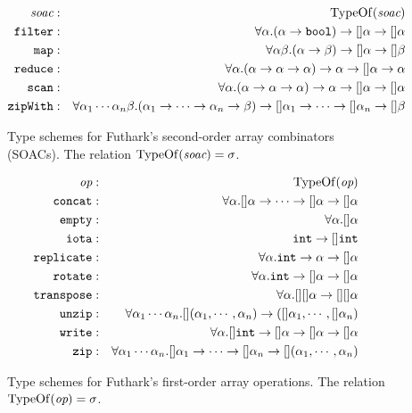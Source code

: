 \documentclass[11pt]{book}
\begin{document}
\begin{figure}
  \begin{eqnarray*}
\mbox{\it{soac}} & : & \mathrm{TypeOf}(\mbox{\it{soac}}) \\
    \texttt{filter} & : & \forall \alpha. (\alpha \rightarrow \mathtt{bool}) \rightarrow []\alpha \rightarrow []\alpha\\
    \texttt{map} & : & \forall \alpha\beta. (\alpha \rightarrow \beta) \rightarrow []\alpha \rightarrow []\beta\\
    \texttt{reduce} & : & \forall \alpha. (\alpha \rightarrow \alpha \rightarrow \alpha) \rightarrow \alpha \rightarrow []\alpha \rightarrow \alpha\\
    \texttt{scan} & : & \forall \alpha. (\alpha \rightarrow \alpha \rightarrow \alpha) \rightarrow \alpha \rightarrow []\alpha \rightarrow []\alpha\\
    \texttt{zipWith} & : & \forall \alpha_1\cdots\alpha_n\beta. (\alpha_1\rightarrow\cdots\rightarrow\alpha_n \rightarrow \beta) \rightarrow []\alpha_1 \rightarrow\cdots\rightarrow []\alpha_n \rightarrow []\beta
  \end{eqnarray*}
  \caption{Type schemes for Futhark's second-order array combinators (SOACs). The relation $\mathrm{TypeOf}(\mbox{\it{soac}}) = \sigma$.}
  \label{fig:soactypeschemes}
\end{figure}

\begin{figure}
  \begin{eqnarray*}
\mbox{\it{op}} & : & \mathrm{TypeOf}(\mbox{\it{op}}) \\
    \texttt{concat} & : & \forall \alpha. []\alpha \rightarrow \cdots \rightarrow []\alpha \rightarrow []\alpha \\
    \texttt{empty} & : & \forall \alpha. []\alpha \\
    \texttt{iota} & : & \texttt{int} \rightarrow []\texttt{int} \\
    \texttt{replicate} & : & \forall \alpha. \texttt{int} \rightarrow \alpha \rightarrow []\alpha\\
    \texttt{rotate} & : & \forall \alpha. \texttt{int} \rightarrow []\alpha \rightarrow []\alpha\\
    \texttt{transpose} & : & \forall \alpha. [][]\alpha \rightarrow [][]\alpha\\
    \texttt{unzip} & : & \forall \alpha_1\cdots\alpha_n. [](\alpha_1,\cdots,\alpha_n) \rightarrow ([]\alpha_1,\cdots,[]\alpha_n) \\
    \texttt{write} & : & \forall \alpha. []\texttt{int} \rightarrow []\alpha \rightarrow []\alpha \rightarrow []\alpha \\
    \texttt{zip} & : & \forall \alpha_1\cdots\alpha_n. []\alpha_1\rightarrow\cdots\rightarrow[]\alpha_n \rightarrow [](\alpha_1,\cdots,\alpha_n)
  \end{eqnarray*}
  \caption{Type schemes for Futhark's first-order array operations. The relation $\mathrm{TypeOf}(\mbox{\it{op}}) = \sigma$.}
  \label{fig:foactypeschemes}
\end{figure}
\end{document}
